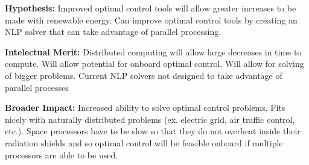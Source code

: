 \documentclass[12pt]{article}
\begin{document}


\textbf{Hypothesis:} Improved optimal control tools will allow greater
increases to be made with renewable energy. Can improve optimal control tools
by creating an NLP solver that can take advantage of parallel processing.

\bigskip



\textbf{Intelectual Merit:} Distributed computing will allow large decreases in
time to compute. Will allow potential for onboard optimal control. Will allow
for solving of bigger problems. Current NLP solvers not designed to take
advantage of parallel processes

\bigskip


\textbf{Broader Impact:} Increased ability to solve optimal control problems.
Fits nicely with naturally distributed problems (ex. electric grid, air traffic
control, etc.). Space processors have to be slow so that they do not overheat
inside their radiation shields and so optimal control will be feasible onboard
if multiple processors are able to be used.
\end{document}
